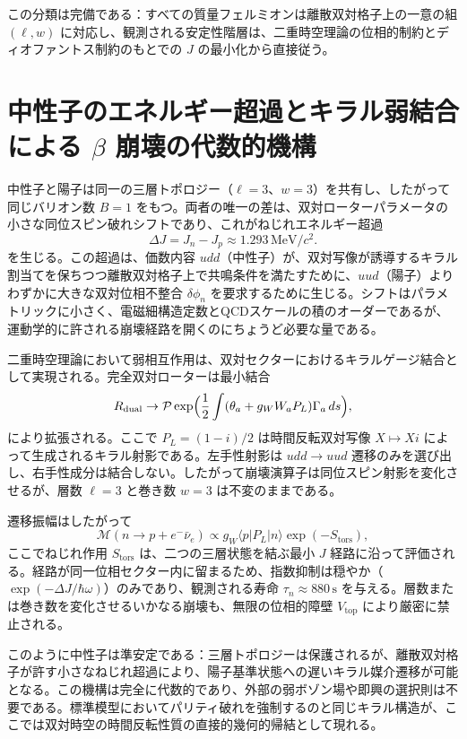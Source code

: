 \documentclass[dvipdfmx,a4paper]{article}
\begin{document}
この分類は完備である：すべての質量フェルミオンは離散双対格子上の一意の組 \((\ell,w)\) に対応し、観測される安定性階層は、二重時空理論の位相的制約とディオファントス制約のもとでの \(J\) の最小化から直接従う。

\section{中性子のエネルギー超過とキラル弱結合による \texorpdfstring{$\beta$}{beta} 崩壊の代数的機構}

中性子と陽子は同一の三層トポロジー（\(\ell=3\)、\(w=3\)）を共有し、したがって同じバリオン数 \(B=1\) をもつ。両者の唯一の差は、双対ローターパラメータの小さな同位スピン破れシフトであり、これがねじれエネルギー超過
\[
\Delta J = J_n - J_p \approx 1.293\,\mathrm{MeV}/c^2.
\]
を生じる。この超過は、価数内容 \(udd\)（中性子）が、双対写像が誘導するキラル割当てを保ちつつ離散双対格子上で共鳴条件を満たすために、\(uud\)（陽子）よりわずかに大きな双対位相不整合 \(\delta\phi_n\) を要求するために生じる。シフトはパラメトリックに小さく、電磁細構造定数とQCDスケールの積のオーダーであるが、運動学的に許される崩壊経路を開くのにちょうど必要な量である。

二重時空理論において弱相互作用は、双対セクターにおけるキラルゲージ結合として実現される。完全双対ローターは最小結合
\[
R_\text{dual} \to \mathcal{P}\exp\Bigl(\frac12\int(\theta_a + g_W W_a P_L)\Gamma_a\,ds\Bigr),
\]
により拡張される。ここで \(P_L = (1-i)/2\) は時間反転双対写像 \(X\mapsto Xi\) によって生成されるキラル射影である。左手性射影は \(udd\to uud\) 遷移のみを選び出し、右手性成分は結合しない。したがって崩壊演算子は同位スピン射影を変化させるが、層数 \(\ell=3\) と巻き数 \(w=3\) は不変のままである。

遷移振幅はしたがって
\[
\mathcal{M}(n\to p+e^-\bar\nu_e) \propto g_W \langle p | P_L | n \rangle \exp(-S_\text{tors}),
\]
ここでねじれ作用 \(S_\text{tors}\) は、二つの三層状態を結ぶ最小 \(J\) 経路に沿って評価される。経路が同一位相セクター内に留まるため、指数抑制は穏やか（\(\exp(-\Delta J/\hbar\omega)\)）のみであり、観測される寿命 \(\tau_n \approx 880\,\mathrm{s}\) を与える。層数または巻き数を変化させるいかなる崩壊も、無限の位相的障壁 \(V_\text{top}\) により厳密に禁止される。

このように中性子は準安定である：三層トポロジーは保護されるが、離散双対格子が許す小さなねじれ超過により、陽子基準状態への遅いキラル媒介遷移が可能となる。この機構は完全に代数的であり、外部の弱ボゾン場や即興の選択則は不要である。標準模型においてパリティ破れを強制するのと同じキラル構造が、ここでは双対時空の時間反転性質の直接的幾何的帰結として現れる。
\end{document}
